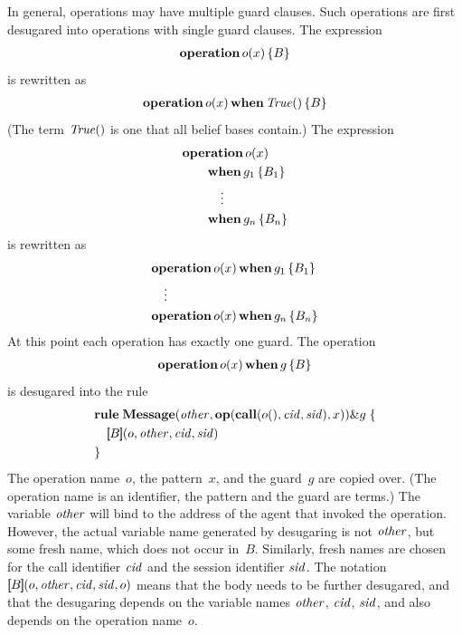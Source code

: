 \documentclass[a4paper,12pt,oneside,fleqn]{book} %
\newcommand{\eval}[1]{[\!\![#1]\!\!]}
\begin{document}
{In general, operations may have multiple guard clauses. Such operations are
first desugared into operations with single guard clauses. The expression
\begin{align}
{\bf operation}\,o(x)\,\{ B \}
\end{align}
is rewritten as
\begin{align}
{\bf operation}\,o(x)\,{\bf when}\,{\it True}()\,\{ B \}
\end{align}
(The term ${\it True}()$ is one that all belief bases contain.) The
expression
\begin{align}
&{\bf operation}\,o(x) \\
&\qquad{\bf when}\,g_1\,\{ B_1 \} \\
&\qquad\quad\vdots\notag \\
&\qquad{\bf when}\,g_n\,\{ B_n \} \\
\end{align}
is rewritten as
\begin{align}
&{\bf operation}\,o(x)\,{\bf when}\,g_1\,\{ B_1 \} \\
&\quad\vdots\notag\\
&{\bf operation}\,o(x)\,{\bf when}\,g_n\,\{ B_n \}
\end{align}
At this point each operation has exactly one guard. The operation
\begin{align}
{\bf operation}\,o(x)\,{\bf when}\,g\,\{ B \}
\end{align}
is desugared into the rule
\begin{align}
\begin{aligned}
&{\bf rule}\;
  {\bf Message}
  ({\it other},
  {\bf op}({\bf call}(o(), {\it cid},{\it sid}), x))\& g \; \{ \\
&\quad \eval{B}(o, {\it other}, {\it cid}, {\it sid}) \\
&\}
\end{aligned}
\end{align}
The operation name~$o$, the pattern~$x$, and the guard~$g$ are copied over.
(The operation name is an identifier, the pattern and the guard are terms.)
The variable $\it other$ will bind to the address of the agent that invoked
the operation. However, the actual variable name generated by desugaring is
not $\it other$, but some fresh name, which does not occur in~$B$.
Similarly, fresh names are chosen for the call identifier $\it cid$ and the
session identifier $\it sid$. The notation $\eval{B}(o, {\it other}, {\it
cid}, {\it sid}, o)$ means that the body needs to be further desugared, and
that the desugaring depends on the variable names $\it other$, $\it cid$,
$\it sid$, and also depends on the operation name~$o$.

}
\end{document}
